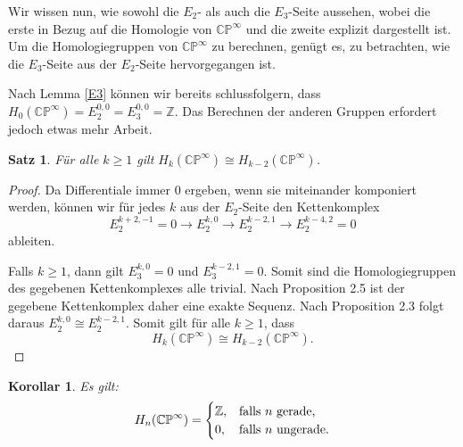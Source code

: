 \documentclass[12pt]{article}
\numberwithin{conj}{section}
\newtheorem{theorem}[conj]{Satz}
\newtheorem{corollary}[conj]{Korollar}
\begin{document}
    Wir wissen nun, wie sowohl die \( E_2 \)- als auch die \( E_3 \)-Seite aussehen, wobei die erste in Bezug auf die Homologie von \( \mathbb{CP}^\infty \) und die zweite explizit dargestellt ist. Um die Homologiegruppen von \( \mathbb{CP}^\infty \) zu berechnen, genügt es, zu betrachten, wie die \( E_3 \)-Seite aus der \( E_2 \)-Seite hervorgegangen ist.

    Nach Lemma \ref{E3} können wir bereits schlussfolgern, dass $H_0(\mathbb{CP}^\infty) = E_2^{0,0} = E_3^{0,0} = \mathbb{Z}$. Das Berechnen der anderen Gruppen erfordert jedoch etwas mehr Arbeit.

    \begin{theorem}
    \label{CPunendlich}
    Für alle \( k \geq 1 \) gilt \( H_k(\mathbb{CP}^\infty) \cong H_{k-2}(\mathbb{CP}^\infty) \).
    \end{theorem}

    \begin{proof}
    Da Differentiale immer \( 0 \) ergeben, wenn sie miteinander komponiert werden, können wir für jedes \( k \) aus der \( E_2 \)-Seite den Kettenkomplex
    \[
    E_2^{k+2, -1} = 0 \to E_2^{k, 0} \to E_2^{k-2, 1} \to E_2^{k-4, 2} = 0
    \]
    ableiten. 

    Falls \( k \geq 1 \), dann gilt \( E_3^{k, 0} = 0 \) und \( E_3^{k-2, 1} = 0 \). Somit sind die Homologiegruppen des gegebenen Kettenkomplexes alle trivial. Nach Proposition 2.5 ist der gegebene Kettenkomplex daher eine exakte Sequenz. Nach Proposition 2.3 folgt daraus \( E_2^{k,0} \cong E_2^{k-2,1} \). Somit gilt für alle \( k \geq 1 \), dass
    \[
    H_k(\mathbb{CP}^\infty) \cong H_{k-2}(\mathbb{CP}^\infty).
    \]
    \end{proof}

    \begin{corollary}
    Es gilt:
    \[
    H_n(\mathbb{CP}^\infty) =
    \begin{cases}
    \mathbb{Z}, & \text{falls \( n \) gerade,} \\
    0, & \text{falls \( n \) ungerade.}
    \end{cases}
    \]
    \end{corollary}
\end{document}
